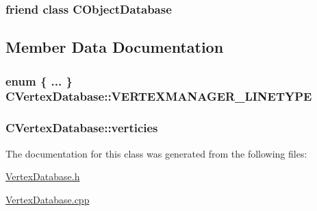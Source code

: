 \subsubsection[{C\+Object\+Database}]{\setlength{\rightskip}{0pt plus 5cm}friend class {\bf C\+Object\+Database}\hspace{0.3cm}{\ttfamily [friend]}}\label{class_c_vertex_database_a8451ee9e81bc51a04afb10dc6ee7e07e}


\subsection{Member Data Documentation}
\hypertarget{class_c_vertex_database_a1d4566bb0607253a780f530d9e25a1fa}{}
\subsubsection[{V\+E\+R\+T\+E\+X\+M\+A\+N\+A\+G\+E\+R\+\_\+\+L\+I\+N\+E\+T\+Y\+P\+E}]{\setlength{\rightskip}{0pt plus 5cm}enum \{ ... \}   C\+Vertex\+Database\+::\+V\+E\+R\+T\+E\+X\+M\+A\+N\+A\+G\+E\+R\+\_\+\+L\+I\+N\+E\+T\+Y\+P\+E}\label{class_c_vertex_database_a1d4566bb0607253a780f530d9e25a1fa}
\hypertarget{class_c_vertex_database_a52990ac767f736fd0e91171ad7a9198e}{}
\subsubsection[{verticies}]{ C\+Vertex\+Database\+::verticies}\label{class_c_vertex_database_a52990ac767f736fd0e91171ad7a9198e}


The documentation for this class was generated from the following files\+:\begin{DoxyCompactItemize}
\item 
\hyperlink{_vertex_database_8h}{Vertex\+Database.\+h}\item 
\hyperlink{_vertex_database_8cpp}{Vertex\+Database.\+cpp}\end{DoxyCompactItemize}
